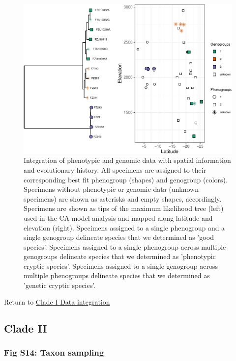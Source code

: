 \documentclass[
  11pt,
]{article}
\begin{document}
\begin{figure}
\includegraphics{Supplementary_Material_files/figure-latex/cladeIfinalDelimitation2-1} \caption{Integration of phenotypic and genomic data with spatial information and evolutionary history. All specimens are assigned to their corresponding best fit phenogroup (shapes) and genogroup (colors). Specimens without phenotypic or genomic data (unknown specimens) are shown as asterisks and empty shapes, accordingly. Specimens are shown as tips of the maximum likelihood tree (left) used in the CA model analysis and mapped along latitude and elevation (right). Specimens assigned to a single phenogroup and a single genogroup delineate species that we determined as 'good species'. Specimens assigned to a single phenogroup across multiple genogroups delineate species that we determined as 'phenotypic cryptic species'. Specimens assigned to a single genogroup across multiple phenogroups delineate species that we determined as 'genetic cryptic species'.}\label{fig:cladeIfinalDelimitation2}
\end{figure}

Return to \protect\hyperlink{data-integration-1}{Clade I Data integration}
\pagebreak

\hypertarget{clade-ii-2}{%
\subsection{Clade II}\label{clade-ii-2}}

\hypertarget{fig-s14-taxon-sampling}{%
\subsubsection{Fig S14: Taxon sampling}\label{fig-s14-taxon-sampling}}
\end{document}
